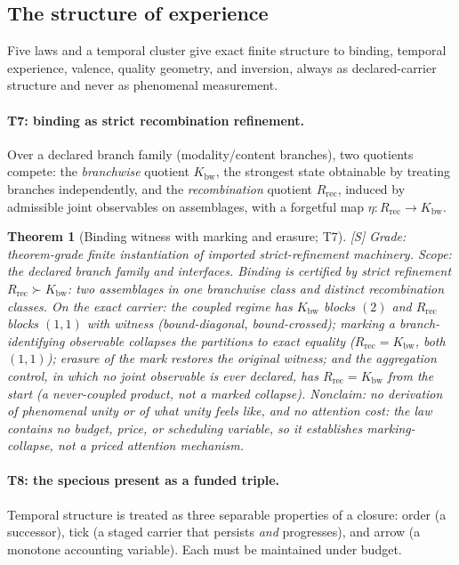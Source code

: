 \documentclass[11pt]{article}
\newcommand{\gradeS}{\textsf{[S]}}
\newcommand{\Kbw}{K_{\mathrm{bw}}}
\newcommand{\Rrec}{R_{\mathrm{rec}}}
\newtheorem{theorem}{Theorem}[section]
\theoremstyle{definition}
\begin{document}
\subsection{The structure of experience}
\label{sec:structure}


Five laws and a temporal cluster give exact finite structure to binding,
temporal experience, valence, quality geometry, and inversion, always as
declared-carrier structure and never as phenomenal measurement.

\paragraph{T7: binding as strict recombination refinement.}
Over a declared branch family (modality/content branches), two quotients
compete: the \emph{branchwise} quotient $\Kbw$, the strongest state obtainable
by treating branches independently, and the \emph{recombination} quotient
$\Rrec$, induced by admissible joint observables on assemblages, with a
forgetful map $\eta : \Rrec \to \Kbw$.

\begin{theorem}[Binding witness with marking and erasure; T7]
\gradeS{} \emph{Grade:} theorem-grade finite instantiation of imported
strict-refinement machinery. \emph{Scope:} the declared branch family and
interfaces. Binding is certified by strict refinement $\Rrec \succ \Kbw$: two
assemblages in one branchwise class and distinct recombination classes. On
the exact carrier: the coupled regime has $\Kbw$ blocks $(2)$ and $\Rrec$
blocks $(1,1)$ with witness (\emph{bound-diagonal}, \emph{bound-crossed});
\emph{marking} a branch-identifying observable collapses the partitions to
exact equality ($\Rrec = \Kbw$, both $(1,1)$); \emph{erasure} of the mark
restores the original witness; and the aggregation control, in which no joint
observable is ever declared, has $\Rrec = \Kbw$ from the start (a
never-coupled product, not a marked collapse). \emph{Nonclaim:} no derivation
of phenomenal unity or of what unity feels like, and no attention cost:
the law contains no budget, price, or scheduling variable, so it establishes
marking-collapse, not a priced attention mechanism.
\end{theorem}

\paragraph{T8: the specious present as a funded triple.}
Temporal structure is treated as three separable properties of a closure:
order (a successor), tick (a staged carrier that persists \emph{and}
progresses), and arrow (a monotone accounting variable). Each must
be maintained under budget.
\end{document}
